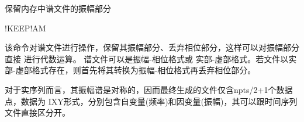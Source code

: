 \label{cmd:keepam}

保留内存中谱文件的振幅部分

\begin{SACSTX}
!KEEP!AM
\end{SACSTX}

该命令对谱文件进行操作，保留其振幅部分、丢弃相位部分，这样可以对振幅部分直接
进行代数运算。
谱文件可以是振幅-相位格式或
实部-虚部格式。若文件以实部-虚部格式存在，则首先将其转换为振幅-相位格式再丢弃相位部分。

对于实序列而言，其振幅谱是对称的，因而最终生成的文件仅含npts/2+1个数据点，数据为
IXY形式，分别包含自变量(频率)和因变量(振幅)，其可以跟时间序列文件直接区分开。
